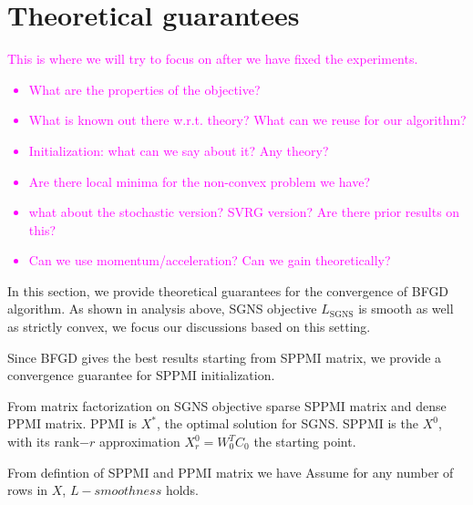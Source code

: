 \documentclass[letterpaper]{article} %
\begin{document}
\section{Theoretical guarantees}
\textcolor{magenta}{This is where we will try to focus on after we have fixed the experiments. 
\begin{itemize}
\item What are the properties of the objective?
\item What is known out there w.r.t. theory? What can we reuse for our algorithm?
\item Initialization: what can we say about it? Any theory?
\item Are there local minima for the non-convex problem we have?
\item what about the stochastic version? SVRG version? Are there prior results on this?
\item Can we use momentum/acceleration? Can we gain theoretically?
\end{itemize}}
In this section, we provide theoretical guarantees for the convergence of BFGD algorithm. As shown in analysis above, SGNS objective $L_\text{SGNS}$ is smooth as well as strictly convex, we focus our discussions based on this setting.

Since BFGD gives the best results starting from SPPMI matrix, we provide a convergence guarantee for SPPMI initialization.

From matrix factorization on SGNS objective \cite{levy2014neural} sparse SPPMI matrix and dense PPMI matrix. PPMI is $X^*$, the optimal solution for SGNS. SPPMI is the $X^0$, with its rank$-r$ approximation $X_r^0=W_0^TC_0$ the starting point.

From defintion of SPPMI and PPMI matrix we have
Assume for any number of rows in $X$, $L-smoothness$ holds.
\end{document}
